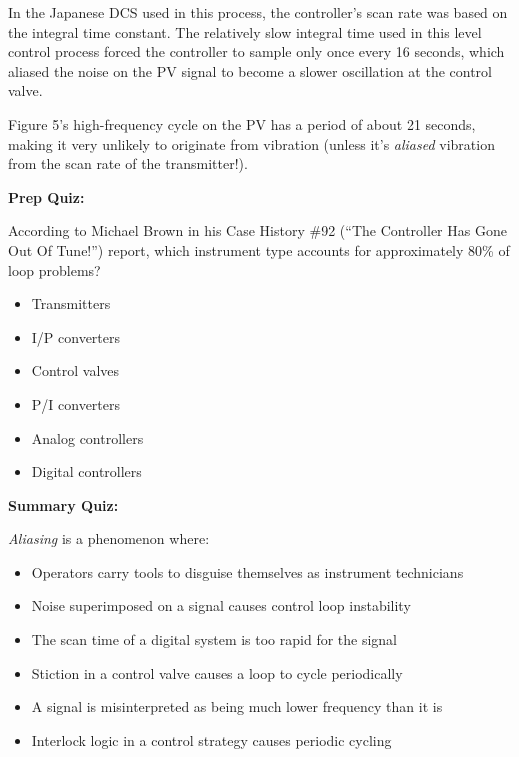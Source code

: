\vskip 10pt

In the Japanese DCS used in this process, the controller's scan rate was based on the integral time constant.  The relatively slow integral time used in this level control process forced the controller to sample only once every 16 seconds, which aliased the noise on the PV signal to become a slower oscillation at the control valve.

\vskip 10pt

Figure 5's high-frequency cycle on the PV has a period of about 21 seconds, making it very unlikely to originate from vibration (unless it's {\it aliased} vibration from the scan rate of the transmitter!).
















\vfil \eject

\noindent
{\bf Prep Quiz:}

According to Michael Brown in his Case History \#92 (``The Controller Has Gone Out Of Tune!'') report, which instrument type accounts for approximately 80\% of loop problems?

\begin{itemize}
\item{} Transmitters
\vskip 10pt
\item{} I/P converters
\vskip 10pt
\item{} Control valves
\vskip 10pt
\item{} P/I converters
\vskip 10pt
\item{} Analog controllers
\vskip 10pt
\item{} Digital controllers
\end{itemize}








\vfil \eject

\noindent
{\bf Summary Quiz:}

{\it Aliasing} is a phenomenon where:

\begin{itemize}
\item{} Operators carry tools to disguise themselves as instrument technicians
\vskip 5pt 
\item{} Noise superimposed on a signal causes control loop instability
\vskip 5pt 
\item{} The scan time of a digital system is too rapid for the signal
\vskip 5pt 
\item{} Stiction in a control valve causes a loop to cycle periodically
\vskip 5pt 
\item{} A signal is misinterpreted as being much lower frequency than it is
\vskip 5pt 
\item{} Interlock logic in a control strategy causes periodic cycling
\end{itemize}





